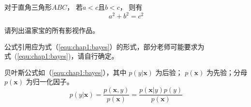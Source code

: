     \begin{theorem}
      \rm 对于直角三角形$ABC$， 若$a<c$且$b<c$， 则有
        \begin{equation}
          a^2+b^2=c^2
        \end{equation}
    \end{theorem}


    \begin{exercise}
          \rm 请列出温家宝的所有影视作品。
    \end{exercise}
    
    {
        \color{red} 公式引用应为式（\ref{equ:chap1:bayes}）的形式，部分老师可能要求为式~(\ref{equ:chap1:bayes})，请自行确定。
    }
    
    贝叶斯公式如（\ref{equ:chap1:bayes}），其中 $p(y|\mathbf{x})$ 为后验；
    $p(\mathbf{x})$ 为先验；分母 $p(\mathbf{x})$ 为归一化因子。
    \begin{equation}
        \label{equ:chap1:bayes}
        p(y|\mathbf{x}) = \frac{p(\mathbf{x},y)}{p(\mathbf{x})}=
        \frac{p(\mathbf{x}|y)p(y)}{p(\mathbf{x})} 
    \end{equation}